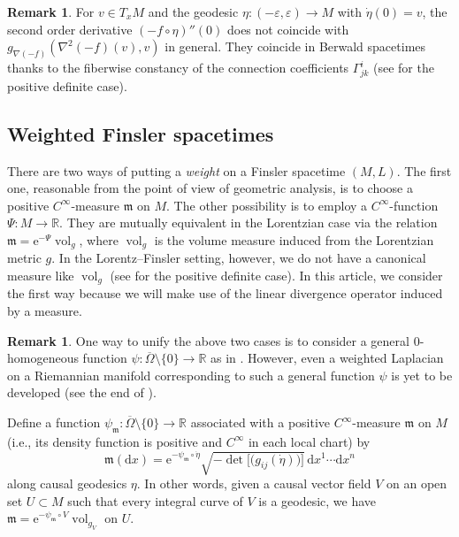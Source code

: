 \documentclass[a4paper,11pt]{article}
\numberwithin{equation}{section}
\theoremstyle{definition}
\newtheorem{remark}[definition]{Remark}
\theoremstyle{plain}
\newcommand{\ve}{\varepsilon}
\newcommand{\lra}{\longrightarrow}
\newcommand{\e}{\mathrm{e}}
\newcommand{\dd}{\mathrm{d}}
\newcommand{\R}{\ensuremath{\mathbb{R}}}
\newcommand{\fm}{\ensuremath{\mathfrak{m}}}
\def\vol{\mathop{\mathrm{vol}}\nolimits}
\newcommand{\ol}[1]{\overline{#1}}
\begin{document}
\begin{remark}\label{rm:Hess}
For $v \in T_xM$ and the geodesic $\eta\colon (-\ve,\ve) \lra M$ with $\dot{\eta}(0)=v$,
the second order derivative $(-f \circ \eta)''(0)$ does not coincide with $g_{\nabla(-f)}(\nabla^2 (-f)(v),v)$ in general.
They coincide in Berwald spacetimes thanks to the fiberwise constancy of the connection coefficients $\Gamma^i_{jk}$
(see \cite[\S 12.1]{Obook} for the positive definite case).
\end{remark}

\subsection{Weighted Finsler spacetimes}\label{ssc:wLF}

There are two ways of putting a \emph{weight} on a Finsler spacetime $(M,L)$.
The first one, reasonable from the point of view of geometric analysis, is to choose a positive $C^\infty$-measure $\fm$ on $M$.
The other possibility is to employ a $C^{\infty}$-function $\Psi \colon M \lra \R$.
They are mutually equivalent in the Lorentzian case via the relation $\fm=\e^{-\Psi} \vol_g$, where $\vol_g$ is the volume measure induced from the Lorentzian metric $g$.
In the Lorentz--Finsler setting, however, we do not have a canonical measure like $\vol_g$ (see \cite{ORand,Obook} for the positive definite case).
In this article, we consider the first way because we will make use of the linear divergence operator induced by a measure.

\begin{remark}\label{rm:meas}
One way to unify the above two cases is to consider a general $0$-homogeneous function
$\psi\colon \ol{\Omega} \setminus \{0\} \lra \R$ as in  \cite{LMO1,LMO2}.
However, even a weighted Laplacian on a Riemannian manifold corresponding to such a general function $\psi$ is yet to be developed (see the end of \cite[\S 3.3]{LMO2}).
\end{remark}

Define a function $\psi_{\fm} \colon \ol{\Omega} \setminus \{0\} \lra \R$ associated with a positive $C^\infty$-measure $\fm$ on $M$ (i.e., its density function is positive and $C^\infty$ in each local chart) by
\[ \fm(\dd x) =\e^{-\psi_{\fm} \circ \dot{\eta}} \sqrt{-\det\bigl[ \bigl( g_{ij}(\dot{\eta}) \bigr) \bigr]}
 \,\dd x^1 \cdots \dd x^n \]
along causal geodesics $\eta$.
In other words, given a causal vector field $V$ on an open set $U \subset M$
such that every integral curve of $V$ is a geodesic,
we have $\fm =\e^{-\psi_\fm \circ V} \vol_{g_V}$ on $U$.
\end{document}
